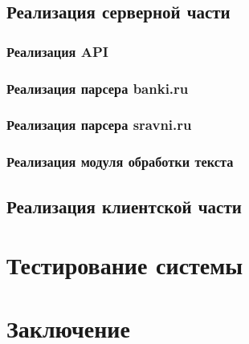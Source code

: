 \documentclass[PI, VKR]{HSEUniversity}
\begin{document}
\section{Реализация серверной части}
\label{sec:orgfc55500}
\subsection{Реализация API}
\label{sec:orgcb3e6dd}
\subsection{Реализация парсера banki.ru}
\label{sec:org304ddbd}
\subsection{Реализация парсера sravni.ru}
\label{sec:orgd0c4eba}
\subsection{Реализация модуля обработки текста}
\label{sec:orgc50799a}
\section{Реализация клиентской части}
\label{sec:orgd52c18a}
\chapter{Тестирование системы}
\label{sec:orgdcfd001}
\chapter*{Заключение}
\label{sec:org639b440}
\putbibliography
\appendix
\end{document}
